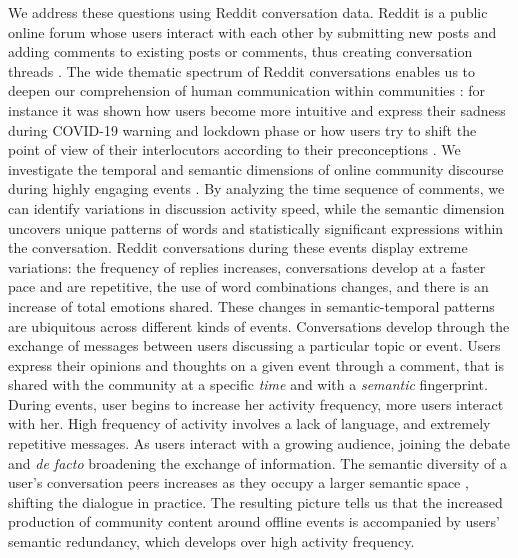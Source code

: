 \documentclass[fleqn,10pt]{wlscirep}
\begin{document}
We address these questions using Reddit conversation data. 
Reddit is a public online forum whose users interact with each other by submitting new posts and adding comments to existing posts or comments, thus creating conversation threads \cite{choi_characterizing_2015}. 
The wide thematic spectrum of Reddit conversations enables us to deepen our comprehension of human communication within communities \cite{proferes2021studying}: for instance it was shown how users become more intuitive and express their sadness during COVID-19 warning and lockdown phase \cite{ashokkumar2021social} or how users try to shift the point of view of their interlocutors according to their preconceptions \cite{monti2022language}.
We investigate the temporal and semantic dimensions of online community discourse during highly engaging events \cite{sasahara2013quantifying,he2017measuring,szell_contraction_2014}.
By analyzing the time sequence of comments, we can identify variations in discussion activity speed, while the semantic dimension uncovers unique patterns of words and statistically significant expressions within the conversation.
Reddit conversations during these events display extreme variations: the frequency of replies increases, conversations develop at a faster pace and are repetitive, the use of word combinations changes, and there is an increase of total emotions shared.
These changes in semantic-temporal patterns are ubiquitous across different kinds of events.
Conversations develop through the exchange of messages between users discussing a particular topic or event.
Users express their opinions and thoughts on a given event through a comment, that is shared with the community at a specific \emph{time} and with a \emph{semantic} fingerprint. 
During events, user begins to increase her activity frequency, more users interact with her. 
High frequency of activity involves a lack of language, and extremely repetitive messages.
As users interact with a growing audience, joining the debate and \emph{de facto} broadening the exchange of information.
The semantic diversity of a user's conversation peers increases as they occupy a larger semantic space \cite{gonzalez2008understanding,lombardo2022mobility}, shifting the dialogue in practice.
The resulting picture tells us that the increased production of community content around offline events is accompanied by users' semantic redundancy, which develops over high activity frequency.
\end{document}
